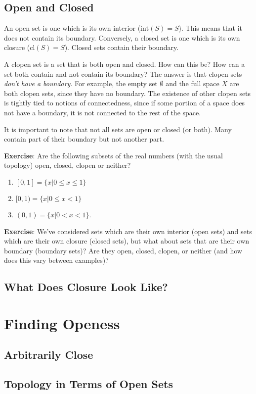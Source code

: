 \documentclass{report}
\newcommand{\cl}{\mathrm{cl}}
\newcommand{\intr}{\mathrm{int}}
\begin{document}
\section{Open and Closed}

An open set is one which is its own interior ($\intr(S) = S$). This means that it does not contain its boundary. Conversely, a closed set is one which is its own closure ($\cl(S) = S$). Closed sets contain their boundary.

A clopen set is a set that is both open and closed. How can this be? How can a set both contain and not contain its boundary? The answer is that clopen sets \emph{don't have a boundary}. For example, the empty set $∅$ and the full space $X$ are both clopen sets, since they have no boundary. The existence of other clopen sets is tightly tied to notions of connectedness, since if some portion of a space does not have a boundary, it is not connected to the rest of the space.

It is important to note that not all sets are open or closed (or both). Many contain part of their boundary but not another part.

{\bf Exercise}: Are the following subsets of the real numbers (with the usual topology) open, closed, clopen or neither?
\begin{enumerate}
\item $[0,1] = \{x | 0 ≤ x ≤ 1\}$
\item $[0,1) = \{x | 0 ≤ x < 1\}$
\item $(0,1) = \{x | 0 < x < 1\}$.
\end{enumerate}

{\bf Exercise}: We've considered sets which are their own interior (open sets) and sets which are their own closure (closed sets), but what about sets that are their own boundary (boundary sets)? Are they open, closed, clopen, or neither (and how does this vary between examples)?



\section{What Does Closure Look Like?}

\chapter{Finding Openess}

\section{Arbitrarily Close}

\section{Topology in Terms of Open Sets}
\end{document}
